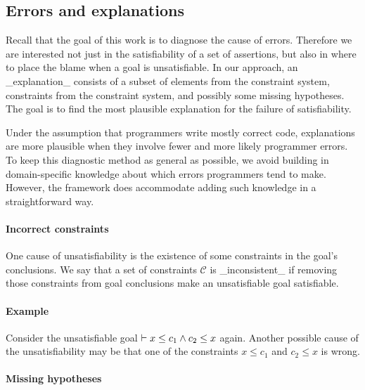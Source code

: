 \subsection{Errors and explanations}

Recall that the goal of this work is to diagnose the cause of errors.
Therefore we are interested not just in the satisfiability of a
set of assertions, but also in where to place the blame when
a goal is unsatisfiable. In our approach,
an _explanation_ consists of a subset of elements from the constraint
system, constraints from the constraint system, and possibly some
missing hypotheses. The goal is to find the most plausible
explanation for the failure of satisfiability. 

Under the assumption that programmers write mostly correct code,
explanations are more plausible when they involve fewer and more
likely programmer errors. To keep this diagnostic method as general as
possible, we avoid building in domain-specific knowledge about which
errors programmers tend to make. However, the framework does
accommodate adding such knowledge in a straightforward way.


\paragraph{Incorrect constraints}

One cause of unsatisfiability is the existence of some constraints
in the goal's conclusions. We say that a set of constraints
$\mathcal{C}$ is _inconsistent_ if removing those constraints from
goal conclusions make an unsatisfiable goal satisfiable.

\paragraph{Example}

Consider the unsatisfiable goal $\vdash x \leq c_1 \land c_2 \leq x$
again. Another possible cause of the unsatisfiability may be that one
of the constraints $x \leq c_1$ and $c_2 \leq x$ is wrong. 

\paragraph{Missing hypotheses}

